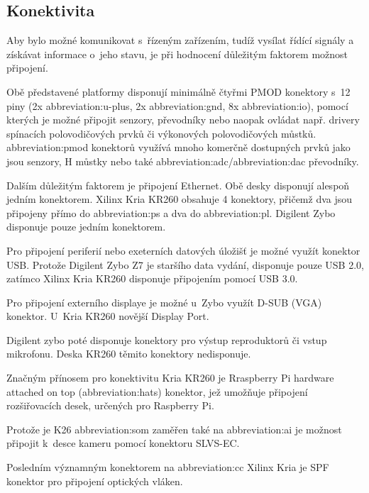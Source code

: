 \documentclass[a4paper, twoside, 11pt]{article}
\begin{document}
			\subsection{Konektivita}
					Aby bylo možné komunikovat s~řízeným zařízením, tudíž vysílat řídící signály a získávat informace o~jeho stavu, je při hodnocení důležitým faktorem možnost připojení.\par
					Obě představené platformy disponují minimálně čtyřmi PMOD konektory s~12 piny (2x \gls{abbreviation:u-plus}, 2x \gls{abbreviation:gnd}, 8x \gls{abbreviation:io}), pomocí kterých je možné připojit senzory, převodníky nebo naopak ovládat např. drivery spínacích polovodičových prvků či výkonových polovodičových můstků. \gls{abbreviation:pmod} konektorů využívá mnoho komerčně dostupných prvků jako jsou senzory, H můstky nebo také \gls{abbreviation:adc}/\gls{abbreviation:dac} převodníky.\par
					Dalším důležitým faktorem je připojení Ethernet. Obě desky disponují alespoň jedním konektorem. Xilinx Kria KR260 obsahuje 4 konektory, přičemž dva jsou připojeny přímo do \gls{abbreviation:ps} a dva do \gls{abbreviation:pl}. Digilent Zybo disponuje pouze jedním konektorem.\par
					Pro připojení periferií nebo exeterních datových úložišť je možné využít konektor USB. Protože Digilent Zybo Z7 je staršího data vydání, disponuje pouze USB 2.0, zatímco Xilinx Kria KR260 disponuje připojením pomocí USB 3.0.\par
					Pro připojení externího displaye je možné u~Zybo využít D-SUB (VGA) konektor. U~Kria KR260 novější Display Port.\par
					Digilent zybo poté disponuje konektory pro výstup reproduktorů či vstup mikrofonu. Deska KR260 těmito konektory nedisponuje.\par
					Značným přínosem pro konektivitu Kria KR260 je Rraspberry Pi hardware attached on top (\gls{abbreviation:hats}) konektor, jež umožňuje připojení rozšiřovacích desek, určených pro Raspberry Pi.\par
					Protože je K26 \gls{abbreviation:som} zaměřen také na \gls{abbreviation:ai} je možnost připojit k~desce kameru pomocí konektoru SLVS-EC.\par
					Posledním významným konektorem na \gls{abbreviation:cc} Xilinx Kria je SPF konektor pro připojení optických vláken.
\end{document}
